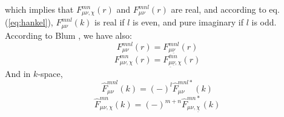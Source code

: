 \begin{enumerate}
\begin{equation}
\end{equation}
which implies that $F_{\mu\nu,\chi}^{mn}(r)$ and $F_{\mu\nu}^{mnl}(r)$
are real, and according to eq. (\ref{eq:hankel}), $F_{\mu\nu}^{mnl}(k)$
is real if $l$ is even, and pure imaginary if $l$ is odd. According
to Blum \citep{Blum_I}, we have also:
\begin{equation}
F_{\mu\nu}^{mnl}(r)=F_{\underline{\mu}\underline{\nu}}^{mnl}(r)
\end{equation}
\begin{equation}
F_{\mu\nu,\chi}^{mn}(r)=F_{\underline{\mu}\underline{\nu},\chi}^{mn}(r)
\end{equation}
And in $k$-space,
\begin{equation}
\hat{F}_{\mu\nu}^{mnl}(k)=\left(-\right)^{l}\hat{F}_{\mu\nu}^{mnl*}(k)
\end{equation}
\begin{equation}
\hat{F}_{\mu\nu,\chi}^{mn}(k)=\left(-\right)^{m+n}\hat{F}_{\mu\nu,\underline{\chi}}^{mn*}(k)
\end{equation}
\end{enumerate}

